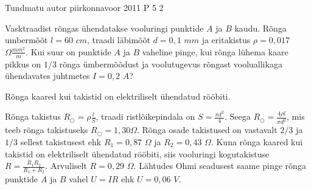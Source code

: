 {Tundmatu autor} %
{piirkonnavoor} %
{2011} %
{P 5} %
{2} %
{

\ifStatement
Vasktraadist rõngas ühendatakse vooluringi punktide $A$ ja $B$ kaudu. Rõnga umbermõõt  $l = 60$ $cm$, traadi läbimõõt $d = 0,1$ $mm$ ja eritakistus $\rho = 0,017$ $\Omega \frac{mm^2}{m}$. Kui suur on punktide $A$ ja $B$ vaheline pinge, kui rõnga lühema kaare pikkus on $1/3$ rõnga ümbermõõdust ja voolutugevus rõngast vooluallikaga ühendavates juhtmetes $I = 0,2$ $A$?
\fi

\ifHint
Rõnga kaared kui takistid on elektriliselt ühendatud rööbiti.
\fi

\ifSolution
Rõnga takistus $R_{\bigcirc} = \rho \frac{l}{S}$, traadi ristlõikepindala on $S = \frac{\pi d^2}{4}$. Seega $R_{\bigcirc} = \frac{4 \rho l}{\pi d^2}$, mis teeb rõnga takistuseks $R_{\bigcirc} = 1,30 \Omega$. Rõnga osade takistused on vastavalt $2/3$ ja $1/3$ sellest takistusest ehk $R_1 = 0,87$ $\Omega$ ja $R_2 = 0,43$ $\Omega$. Kuna rõnga kaared kui takistid on elektriliselt ühendatud rööbiti, siis vooluringi kogutakistuse $R = \frac{R_1 R_2}{R_1 + R_2}$. Arvuliselt $R = 0,29$ $\Omega$. Lähtudes Ohmi seadusest saame pinge rõnga punktide $A$ ja $B$ vahel $U = IR$ ehk $U = 0,06$ $V$.
\fi
}
